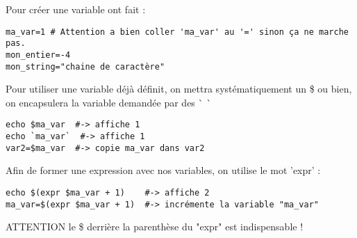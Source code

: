 \documentclass{article}
\begin{document}
Pour créer une variable ont fait :

\begin{verbatim}
ma_var=1 # Attention a bien coller 'ma_var' au '=' sinon ça ne marche pas.
mon_entier=-4
mon_string="chaine de caractère"
\end{verbatim}

Pour utiliser une variable déjà définit, on mettra systématiquement un \$ ou bien, on encapsulera la variable demandée par des \`{} \`{}

\begin{verbatim}
echo $ma_var  #-> affiche 1
echo `ma_var`  #-> affiche 1
var2=$ma_var  #-> copie ma_var dans var2
\end{verbatim}

Afin de former une expression avec nos variables, on utilise le mot 'expr' :

\begin{verbatim}
echo $(expr $ma_var + 1)    #-> affiche 2
ma_var=$(expr $ma_var + 1)  #-> incrémente la variable "ma_var"
\end{verbatim}

ATTENTION le \$ derrière la parenthèse du "expr" est indispensable !
\end{document}
